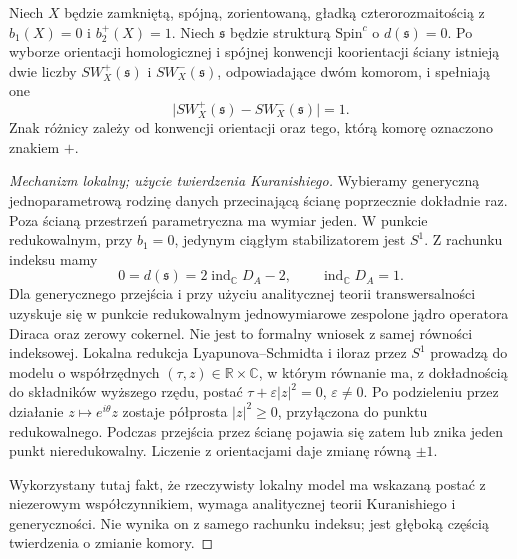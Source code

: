 \begin{twierdzenie}
\label{thm:tg-sw-wallcross}
Niech $X$ będzie zamkniętą, spójną, zorientowaną,
gładką czterorozmaitością z $b_1(X)=0$ i $b_2^+(X)=1$.
Niech $\mathfrak s$ będzie strukturą $\mathrm{Spin}^c$
o $d(\mathfrak s)=0$. Po wyborze orientacji homologicznej
i spójnej konwencji koorientacji ściany istnieją dwie
liczby $SW_X^+(\mathfrak s)$ i $SW_X^-(\mathfrak s)$,
odpowiadające dwóm komorom, i spełniają one
\[
\bigl|SW_X^+(\mathfrak s)-SW_X^-(\mathfrak s)\bigr|=1.
\]
Znak różnicy zależy od konwencji orientacji oraz tego,
którą komorę oznaczono znakiem $+$.
\end{twierdzenie}

\begin{proof}[Mechanizm lokalny; użycie twierdzenia Kuranishiego]
Wybieramy generyczną jednoparametrową rodzinę danych
przecinającą ścianę poprzecznie dokładnie raz.
Poza ścianą przestrzeń parametryczna ma wymiar jeden.
W punkcie redukowalnym, przy $b_1=0$, jedynym ciągłym
stabilizatorem jest $S^1$. Z rachunku indeksu mamy
\[
0=d(\mathfrak s)=2\operatorname{ind}_{\mathbb C}D_A-2,
\qquad\operatorname{ind}_{\mathbb C}D_A=1.
\]
Dla generycznego przejścia i przy użyciu analitycznej
teorii transwersalności uzyskuje się w punkcie redukowalnym
jednowymiarowe zespolone jądro operatora Diraca oraz
zerowy cokernel. Nie jest to formalny wniosek z samej
równości indeksowej. Lokalna redukcja Lyapunova--Schmidta
i iloraz przez $S^1$ prowadzą do modelu o współrzędnych
$(\tau,z)\in\mathbb R\times\mathbb C$, w którym równanie
ma, z dokładnością do składników wyższego rzędu, postać
$\tau+\varepsilon|z|^2=0$, $\varepsilon\ne0$.
Po podzieleniu przez działanie $z\mapsto e^{i\theta}z$
zostaje półprosta $|z|^2\geq0$, przyłączona do punktu
redukowalnego. Podczas przejścia przez ścianę
pojawia się zatem lub znika jeden punkt nieredukowalny.
Liczenie z orientacjami daje zmianę równą $\pm1$.

Wykorzystany tutaj fakt, że rzeczywisty lokalny model
ma wskazaną postać z niezerowym współczynnikiem,
wymaga analitycznej teorii Kuranishiego i generyczności.
Nie wynika on z samego rachunku indeksu; jest głęboką
częścią twierdzenia o zmianie komory.
\end{proof}


